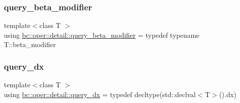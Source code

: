 \mbox{\label{namespacebc_1_1oper_1_1detail_abb9645396fc587030351c50ca6b427e2}} 
\subsubsection{\texorpdfstring{query\+\_\+beta\+\_\+modifier}{query\_beta\_modifier}}
{\footnotesize\ttfamily template$<$class T $>$ \\
using \hyperlink{namespacebc_1_1oper_1_1detail_abb9645396fc587030351c50ca6b427e2}{bc\+::oper\+::detail\+::query\+\_\+beta\+\_\+modifier} = typedef typename T\+::beta\+\_\+modifier}

\mbox{\label{namespacebc_1_1oper_1_1detail_a645b64273216ac6f751a3027610957a6}} 
\subsubsection{\texorpdfstring{query\+\_\+dx}{query\_dx}}
{\footnotesize\ttfamily template$<$class T $>$ \\
using \hyperlink{namespacebc_1_1oper_1_1detail_a645b64273216ac6f751a3027610957a6}{bc\+::oper\+::detail\+::query\+\_\+dx} = typedef decltype(std\+::declval$<$T$>$().dx)}


